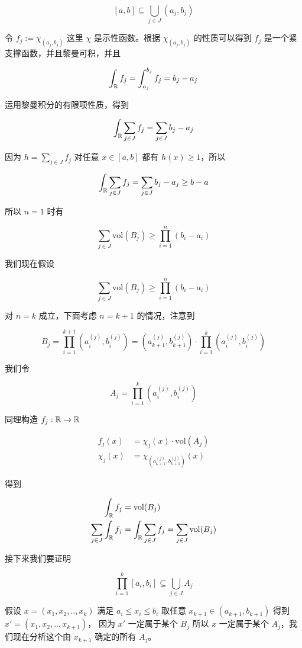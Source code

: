 \[
    [a,b] \subseteq \bigcup_{j \in J}(a_j, b_j)
\]

令 $f_j := \chi_{(a_j, b_j)}$ 这里 $\chi$ 是示性函数。根据 $\chi_{(a_j, b_j)}$  的性质可以得到 $f_j$ 是一个紧支撑函数，并且黎曼可积，并且

\[
\int_{\mathbb{R}}f_j = \int_{a_j}^{b_j}f_j = b_j - a_j
\]

运用黎曼积分的有限项性质，得到

\[
\int_{\mathbb{R}} \sum_{j \in J} f_j = \sum_{j \in J}b_j - a_j
\]

因为 $h = \sum_{j \in J} f_j$ 对任意 $x \in [a,b]$ 都有 $h(x) \ge 1$，所以 

\[
\int_{\mathbb{R}} \sum_{j \in J} f_j = \sum_{j \in J}b_j - a_j \ge b -a
\]

所以 $n=1$ 时有

\[
\sum_{j \in J} \mathrm{vol}(B_j) \ge \prod_{i=1}^{n}(b_i - a_i)
\]

我们现在假设 


\[
\sum_{j \in J} \mathrm{vol}(B_j) \ge \prod_{i=1}^{n}(b_i - a_i)
\]

对 $n = k$ 成立，下面考虑 $n = k +1$ 的情况，注意到

\[
    B_j = \prod_{i=1}^{k+1}(a_i^{(j)}, b_i^{(j)}) = (a_{k+1}^{(j)}, b_{k+1}^{(j)}) \cdot \prod_{i=1}^{k}(a_i^{(j)}, b_i^{(j)})
\]

我们令 

\[
    A_j = \prod_{i=1}^{k}(a_i^{(j)}, b_i^{(j)})
\]

同理构造 $f_j: \mathbb{R} \to \mathbb{R}$

\begin{align*}
    f_j(x) &= \chi_{j}(x)  \cdot \mathrm{vol}(A_j) \\
\chi_{j}(x) &= \chi_{(a_{k+1}^{(j)}, b_{k+1}^{(j)})}(x) 
\end{align*}

得到

\begin{align*}
    \int_{\mathbb{R}} f_j &= \mathrm{vol}(B_j) \\
    \sum_{j \in J} \int_{\mathbb{R}} f_j &=  \int_{\mathbb{R}}\sum_{j \in J} f_j = \sum_{j \in J} \mathrm{vol}(B_j)
\end{align*}


接下来我们要证明 

\[
\prod_{i=1}^{k}[a_i, b_i] \subseteq \bigcup_{j \in J} A_j
\]

假设 $x =(x_1, x_2, .., x_k) $ 满足 $a_i \le x_i \le b_i$ 取任意 $x_{k+1} \in (a_{k+1}, b_{k+1}) $ 
得到 $x' = (x_1, x_2, ..,x_{k+1})$，
因为 $x'$ 一定属于某个 $B_j$ 所以 $x$ 一定属于某个 $A_j$，我们现在分析这个由 $x_{k+1} $ 确定的所有 $A_j$。

